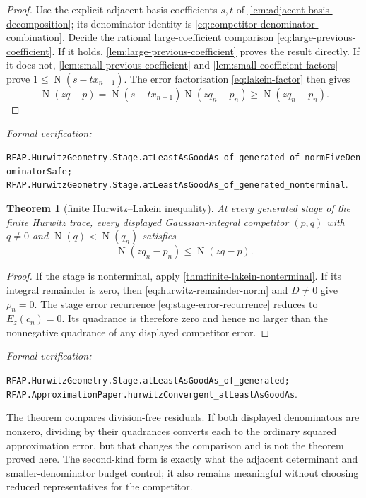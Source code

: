 \documentclass[11pt]{article}
\newtheorem{theorem}{Theorem}[section]
\newcommand{\Norm}[1]{\operatorname{N}\!\left(#1\right)}
\newcommand{\leanref}[1]{\par\smallskip\noindent
  \emph{Formal verification:}\par\nobreak
  {\raggedright\nolinkurl{#1}.\par}}
\begin{document}
\begin{proof}
Use the explicit adjacent-basis coefficients $s,t$ of
\cref{lem:adjacent-basis-decomposition}; its denominator identity is
\eqref{eq:competitor-denominator-combination}.  Decide the rational
large-coefficient comparison \eqref{eq:large-previous-coefficient}.  If it
holds, \cref{lem:large-previous-coefficient} proves the result directly.  If
it does not, \cref{lem:small-previous-coefficient} and
\cref{lem:small-coefficient-factors} prove
$1\le\Norm{s-tx_{n+1}}$.  The error factorisation
\eqref{eq:lakein-factor} then gives
\[
 \Norm{zq-p}
   =\Norm{s-tx_{n+1}}\Norm{zq_n-p_n}
   \ge\Norm{zq_n-p_n}.
\]
\end{proof}

\leanref{RFAP.HurwitzGeometry.Stage.atLeastAsGoodAs_of_generated_of_normFiveDenominatorSafe;
RFAP.HurwitzGeometry.Stage.atLeastAsGoodAs_of_generated_nonterminal}

\begin{theorem}[finite Hurwitz--Lakein inequality]
\label{thm:finite-lakein-full}
At every generated stage of the finite Hurwitz trace, every displayed
Gaussian-integral competitor $(p,q)$ with
$q\ne0$ and $\Norm q<\Norm{q_n}$ satisfies
\begin{equation}
\label{eq:finite-lakein-full}
                         \Norm{zq_n-p_n}\le\Norm{zq-p}.
\end{equation}
\end{theorem}

\begin{proof}
If the stage is nonterminal, apply
\cref{thm:finite-lakein-nonterminal}.  If its integral remainder is zero,
then \eqref{eq:hurwitz-remainder-norm} and $D\ne0$ give $\rho_n=0$.  The
stage error recurrence \eqref{eq:stage-error-recurrence} reduces to
$E_z(c_n)=0$.  Its quadrance is therefore zero and hence no larger than the
nonnegative quadrance of any displayed competitor error.
\end{proof}

\leanref{RFAP.HurwitzGeometry.Stage.atLeastAsGoodAs_of_generated;
RFAP.ApproximationPaper.hurwitzConvergent_atLeastAsGoodAs}

The theorem compares division-free residuals.  If both displayed
denominators are nonzero, dividing by their quadrances converts each to the
ordinary squared approximation error, but that changes the comparison and
is not the theorem proved here.  The second-kind form is exactly what the
adjacent determinant and smaller-denominator budget control; it also remains
meaningful without choosing reduced representatives for the competitor.
\end{document}
